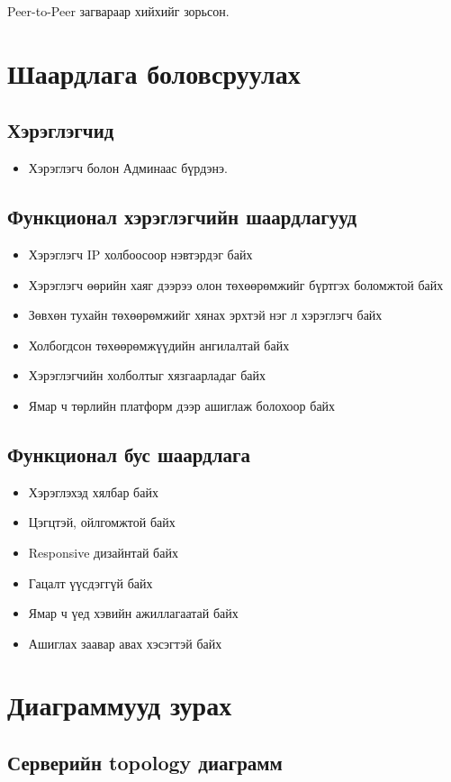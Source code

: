 \quad \quad Peer-to-Peer загвараар хийхийг зорьсон.
\section{Шаардлага боловсруулах}
  \subsection{Хэрэглэгчид}
    \begin{itemize}
        \item Хэрэглэгч болон Админаас бүрдэнэ.
    \end{itemize}
	\subsection{Функционал хэрэглэгчийн шаардлагууд}
     \begin{itemize}
        \item Хэрэглэгч IP холбоосоор нэвтэрдэг байх
        \item Хэрэглэгч өөрийн хаяг дээрээ олон төхөөрөмжийг бүртгэх боломжтой байх
        \item Зөвхөн тухайн төхөөрөмжийг хянах эрхтэй нэг л хэрэглэгч байх
        \item Холбогдсон төхөөрөмжүүдийн ангилалтай байх
        \item Хэрэглэгчийн холболтыг хязгаарладаг байх
        \item Ямар ч төрлийн платформ дээр ашиглаж болохоор байх
    \end{itemize}
  \subsection{Функционал бус шаардлага}
    \begin{itemize}
        \item Хэрэглэхэд хялбар байх
        \item Цэгцтэй, ойлгомжтой байх
        \item Responsive дизайнтай байх
        \item Гацалт үүсдэггүй байх
        \item Ямар ч үед хэвийн ажиллагаатай байх
        \item Ашиглах заавар авах хэсэгтэй байх
    \end{itemize}
\section{Диаграммууд зурах}
	\subsection{Серверийн topology диаграмм}	

